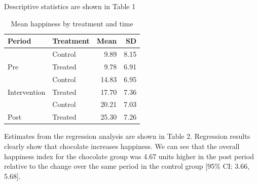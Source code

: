 \documentclass[
]{article}
\begin{document}
Descriptive statistics are shown in Table 1

\begin{table}

\caption{\label{tab:table1}Mean happiness by treatment and time}
\centering
\begin{tabular}[t]{llrr}
\toprule
Period & Treatment & Mean & SD\\
\midrule
 & Control & 9.89 & 8.15\\
\cmidrule{2-4}
\multirow{-2}{*}{\raggedright\arraybackslash Pre} & Treated & 9.78 & 6.91\\
\cmidrule{1-4}
 & Control & 14.83 & 6.95\\
\cmidrule{2-4}
\multirow{-2}{*}{\raggedright\arraybackslash Intervention} & Treated & 17.70 & 7.36\\
\cmidrule{1-4}
 & Control & 20.21 & 7.03\\
\cmidrule{2-4}
\multirow{-2}{*}{\raggedright\arraybackslash Post} & Treated & 25.30 & 7.26\\
\bottomrule
\end{tabular}
\end{table}

Estimates from the regression analysis are shown in Table 2. Regression
results clearly show that chocolate increases happiness. We can see that
the overall happiness index for the chocolate group was 4.67 units
higher in the post period relative to the change over the same period in
the control group {[}95\% CI: 3.66, 5.68{]}.
\end{document}
